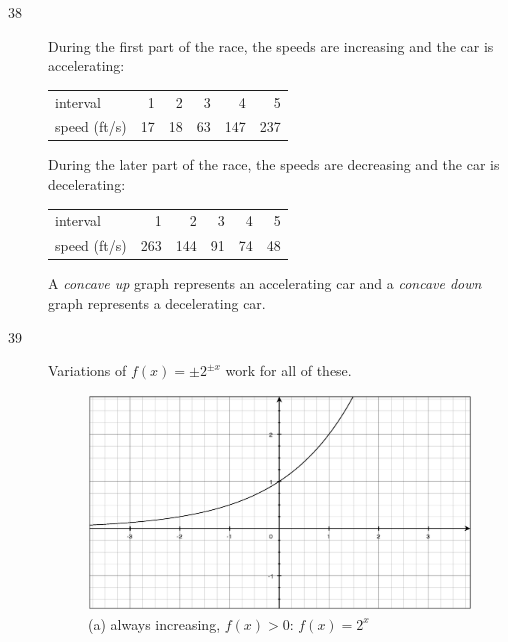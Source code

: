 \documentclass{exam}
\begin{document}
\ifprintanswers
  \begin{description}
    \item[38]
      During the first part of the race, the speeds are increasing and the car is accelerating:

        \begin{tabular}{lrrrrr}
          \toprule
          interval     &  1 &  2 &  3 &   4 &   5 \\ 
          speed (ft/s) & 17 & 18 & 63 & 147 & 237 \\
          \bottomrule
        \end{tabular}

      During the later part of the race, the speeds are decreasing and the car is decelerating:

        \begin{tabular}{lrrrrr}
          \toprule
          interval     &   1 &   2 &  3 &  4 &  5 \\ 
          speed (ft/s) & 263 & 144 & 91 & 74 & 48 \\
          \bottomrule
        \end{tabular}

      A {\em concave up} graph represents an accelerating car and a {\em concave down} graph represents a decelerating car.

    \item[39]
      Variations of $f(x) = \pm 2^{\pm x}$ work for all of these.  
     

      \begin{figure}[H]
        \centering
        \includegraphics[scale=.3]{section_2.3/problem_39a.eps}
        \caption*{(a) always increasing, $f(x) > 0$: $f(x) = 2^x$}
      \end{figure}


\end{description}
\end{document}
